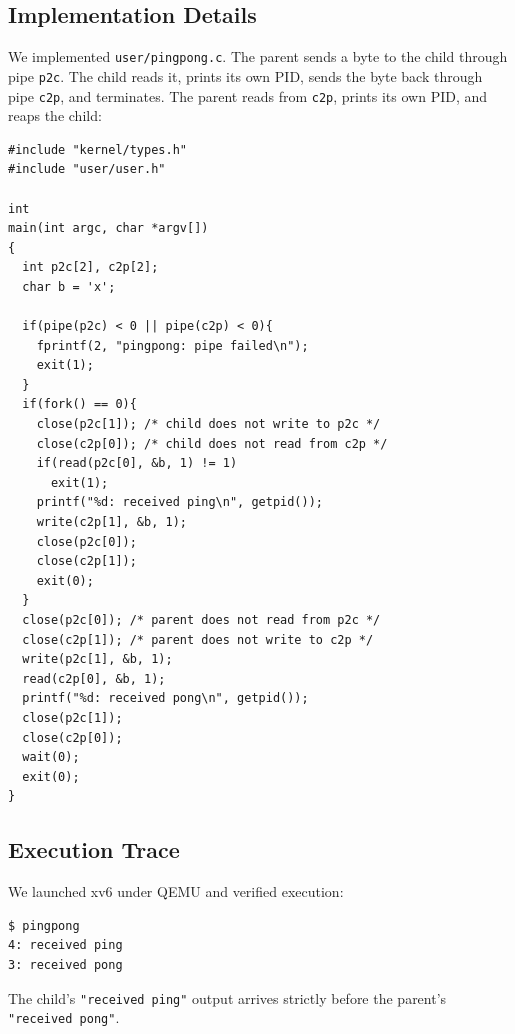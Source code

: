\documentclass[12pt,a4paper]{article}
\begin{document}
\subsection{Implementation Details}
We implemented \texttt{user/pingpong.c}. The parent sends a byte to the child through pipe \texttt{p2c}. The child reads it, prints its own PID, sends the byte back through pipe \texttt{c2p}, and terminates. The parent reads from \texttt{c2p}, prints its own PID, and reaps the child:

\begin{lstlisting}[style=cstyle]
#include "kernel/types.h"
#include "user/user.h"

int
main(int argc, char *argv[])
{
  int p2c[2], c2p[2];
  char b = 'x';

  if(pipe(p2c) < 0 || pipe(c2p) < 0){
    fprintf(2, "pingpong: pipe failed\n");
    exit(1);
  }
  if(fork() == 0){
    close(p2c[1]); /* child does not write to p2c */
    close(c2p[0]); /* child does not read from c2p */
    if(read(p2c[0], &b, 1) != 1)
      exit(1);
    printf("%d: received ping\n", getpid());
    write(c2p[1], &b, 1);
    close(p2c[0]);
    close(c2p[1]);
    exit(0);
  }
  close(p2c[0]); /* parent does not read from p2c */
  close(c2p[1]); /* parent does not write to c2p */
  write(p2c[1], &b, 1);
  read(c2p[0], &b, 1);
  printf("%d: received pong\n", getpid());
  close(p2c[1]);
  close(c2p[0]);
  wait(0);
  exit(0);
}
\end{lstlisting}

\subsection{Execution Trace}
We launched xv6 under QEMU and verified execution:
\begin{lstlisting}[style=consolestyle]
$ pingpong
4: received ping
3: received pong
\end{lstlisting}
The child's \texttt{"received ping"} output arrives strictly before the parent's \texttt{"received pong"}.
\end{document}
